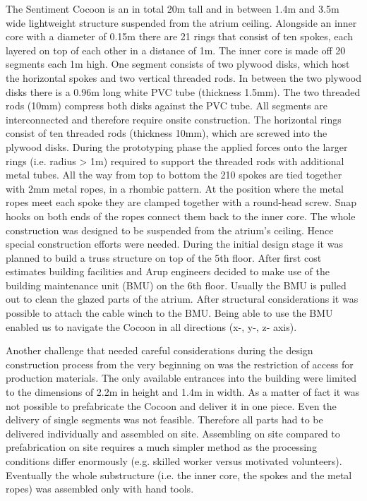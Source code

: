 The Sentiment Cocoon is an in total 20m tall and in between 1.4m and 3.5m wide lightweight structure suspended from the atrium ceiling. 
Alongside an inner core with a diameter of 0.15m there are 21 rings that consist of ten spokes, each layered on top of each other in a distance of 1m. The inner core is made off 20 segments each 1m high. One segment consists of two plywood disks, which host the horizontal spokes and two vertical threaded rods. In between the two plywood disks there is a 0.96m long white PVC tube (thickness 1.5mm). The two threaded rods (10mm) compress both disks against the PVC tube. All segments are interconnected and therefore require onsite construction.
The horizontal rings consist of ten threaded rods (thickness 10mm), which are screwed into the plywood disks. During the prototyping phase the applied forces onto the larger rings (i.e. radius > 1m) required to support the threaded rods with additional metal tubes.
All the way from top to bottom the 210 spokes are tied together with 2mm metal ropes, in a rhombic pattern. At the position where the metal ropes meet each spoke they are clamped together with a round-head screw. Snap hooks on both ends of the ropes connect them back to the inner core.
The whole construction was designed to be suspended from the atrium’s ceiling. Hence special construction efforts were needed. During the initial design stage it was planned to build a truss structure on top of the 5th floor. After first cost estimates building facilities and Arup engineers decided to make use of the building maintenance unit (BMU) on the 6th floor. Usually the BMU is pulled out to clean the glazed parts of the atrium. After structural considerations it was possible to attach the cable winch to the BMU. Being able to use the BMU enabled us to navigate the Cocoon in all directions (x-, y-, z- axis).

Another challenge that needed careful considerations during the design construction process from the very beginning on was the restriction of access for production materials. The only available entrances into the building were limited to the dimensions of 2.2m in height and 1.4m in width. As a matter of fact it was not possible to prefabricate the Cocoon and deliver it in one piece. Even the delivery of single segments was not feasible. Therefore all parts had to be delivered individually and assembled on site. Assembling on site compared to prefabrication on site requires a much simpler method as the processing conditions differ enormously (e.g. skilled worker versus motivated volunteers). Eventually the whole substructure (i.e. the inner core, the spokes and the metal ropes) was assembled only with hand tools.

